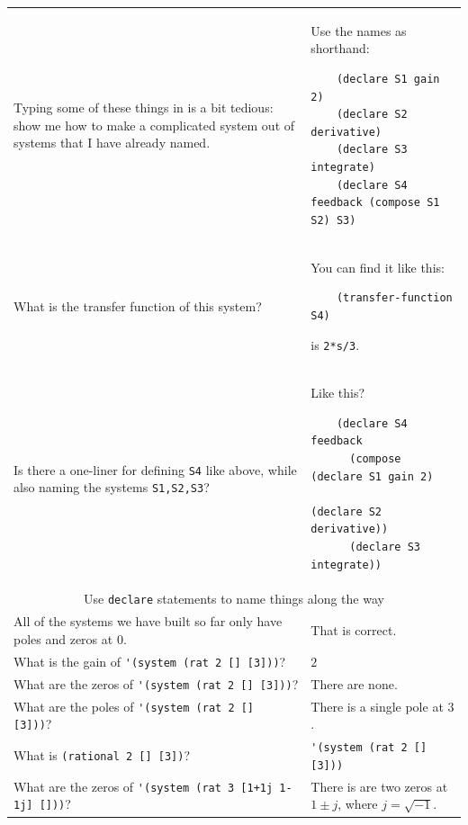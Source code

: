 \documentclass[11pt,letter]{article}
\begin{document}
\begin{longtable}{ p{} p{} }
  \midrule

  Typing some of these things in is a bit tedious: show me how to make a complicated system out of systems that I have already named.
  &
  Use the names as shorthand:
  \begin{lstlisting}
    (declare S1 gain 2)
    (declare S2 derivative)
    (declare S3 integrate)
    (declare S4 feedback (compose S1 S2) S3)
  \end{lstlisting} \\

  What is the transfer function of this system?
  &
  You can find it like this:
  \begin{lstlisting}
    (transfer-function S4)
  \end{lstlisting}
  is \lstinline!2*s/3!. \\

  Is there a one-liner for defining \lstinline!S4! like above, while also naming the systems \lstinline!S1,S2,S3!?
  &
  Like this?
  \begin{lstlisting}
    (declare S4 feedback
      (compose (declare S1 gain 2)
               (declare S2 derivative))
      (declare S3 integrate))
  \end{lstlisting} \\

  \midrule

  \multicolumn{2}{c}{\Large Use \lstinline!declare! statements to name things along the way} \\

  \midrule

  All of the systems we have built so far only have poles and zeros at $0$.
  &
  That is correct. \\

  What is the gain of \lstinline!'(system (rat 2 [] [3]))!?
  &
  $2$ \\

  What are the zeros of \lstinline!'(system (rat 2 [] [3]))!?
  &
  There are none. \\

  What are the poles of \lstinline!'(system (rat 2 [] [3]))!?
  &
  There is a single pole at $3$. \\

  What is \lstinline!(rational 2 [] [3])!?
  &
  \lstinline!'(system (rat 2 [] [3]))! \\

  What are the zeros of \lstinline!'(system (rat 3 [1+1j 1-1j] []))!?
  &
  There is are two zeros at $1\pm j$, where $j=\sqrt{-1}$. \\


\end{longtable}
\end{document}
